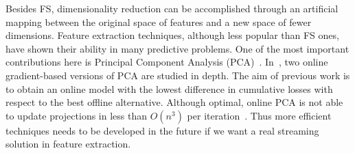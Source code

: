 \documentclass[preprint,12pt]{elsarticle}
\begin{document}
\begin{table}[!htp]
\renewcommand{\arraystretch}{1.3}
\centering
\scriptsize
\caption{Summary description of streaming FS methods. Information about the type of selector (wrapper or filter), the feature conversion accomplished (if appropriate), and whether concept-evolution appears, is presented below.}
\label{tab:fs}
\end{table}

Besides FS, dimensionality reduction can be accomplished through an artificial mapping between the original space of features and a new space of fewer dimensions. Feature extraction techniques, although less popular than FS ones, have shown their ability in many predictive problems. One of the most important contributions here is Principal Component Analysis (PCA)~\cite{jolliffe86}. In~\cite{nie16}, two online gradient-based versions of PCA are studied in depth. The aim of previous work is to obtain an online model with the lowest difference in cumulative losses with respect to the best offline alternative. Although optimal, online PCA is not able to update projections in less than $O(n^3)$ per iteration~\cite{hazan10}. Thus more efficient techniques needs to be developed in the future if we want a real streaming solution in feature extraction.
\end{document}
